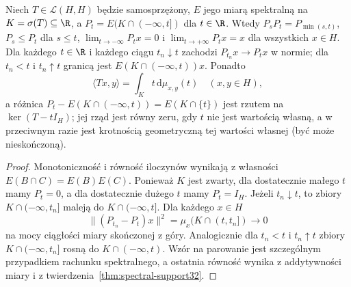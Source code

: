 \begin{twierdzenie}
\label{thm:spectral-family32}
Niech $T\in\mathcal L(H,H)$ będzie samosprzężony, $E$ jego
miarą spektralną na $K=\sigma(T)\subseteq\R$, a
$P_t=E(K\cap(-\infty,t])$ dla $t\in\R$.
Wtedy $P_sP_t=P_{\min(s,t)}$, $P_s\le P_t$ dla $s\le t$,
$\lim_{t\to-\infty}P_tx=0$ i
$\lim_{t\to+\infty}P_tx=x$ dla wszystkich $x\in H$.
Dla każdego $t\in\R$ i każdego ciągu $t_n\downarrow t$
zachodzi $P_{t_n}x\to P_tx$ w normie; dla $t_n<t$
i $t_n\uparrow t$ granicą jest $E(K\cap(-\infty,t))x$.
Ponadto
\[
 \langle Tx,y\rangle=\int_{K}t\,\mathrm d\mu_{x,y}(t)
 \quad(x,y\in H),
\]
a różnica $P_t-E(K\cap(-\infty,t))=E(K\cap\{t\})$
jest rzutem na $\ker(T-tI_H)$; jej rząd jest równy zeru,
gdy $t$ nie jest wartością własną, a w przeciwnym razie
jest krotnością geometryczną tej wartości własnej (być może
nieskończoną).
\end{twierdzenie}
\begin{proof}
Monotoniczność i równość iloczynów wynikają z własności
$E(B\cap C)=E(B)E(C)$. Ponieważ $K$ jest zwarty,
dla dostatecznie małego $t$ mamy $P_t=0$, a dla dostatecznie
dużego $t$ mamy $P_t=I_H$.
Jeżeli $t_n\downarrow t$, to zbiory $K\cap(-\infty,t_n]$
maleją do $K\cap(-\infty,t]$. Dla każdego $x\in H$
\[
 \|(P_{t_n}-P_t)x\|^2
 =\mu_x(K\cap(t,t_n])\longrightarrow0
\]
na mocy ciągłości miary skończonej z góry.
Analogicznie dla $t_n<t$ i $t_n\uparrow t$ zbiory
$K\cap(-\infty,t_n]$ rosną do $K\cap(-\infty,t)$.
Wzór na parowanie jest szczególnym przypadkiem
rachunku spektralnego, a ostatnia równość wynika
z addytywności miary i z twierdzenia~\ref{thm:spectral-support32}.
\end{proof}

